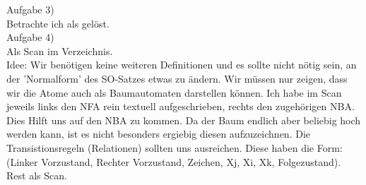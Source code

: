 \documentclass[12pt]{article}
\begin{document}
Aufgabe 3)\\
Betrachte ich als gelöst.\\

Aufgabe 4)\\
Als Scan im Verzeichnis.\\
Idee: Wir benötigen keine weiteren Definitionen und es sollte nicht nötig sein, an der 'Normalform' des SO-Satzes etwas zu ändern.
Wir müssen nur zeigen, dass wir die Atome auch als Baumautomaten darstellen können. Ich habe im Scan jeweils links den NFA rein textuell aufgeschrieben, rechts den zugehörigen NBA. Dies Hilft uns auf den NBA zu kommen. Da der Baum endlich aber beliebig hoch werden kann, ist es nicht besonders ergiebig diesen aufzuzeichnen. Die Transistionsregeln (Relationen) sollten uns ausreichen.
Diese haben die Form: (Linker Vorzustand, Rechter Vorzustand, Zeichen, Xj, Xi, Xk, Folgezustand). Rest als Scan.
\end{document}
